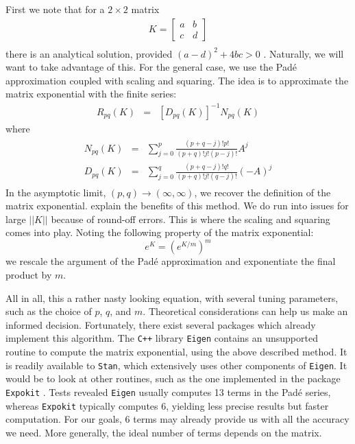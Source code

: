 \documentclass[11pt]{article}
\begin{document}
First we note that for a $2 \times 2$ matrix
\begin{eqnarray*}
   K = \left[\begin{array}{cc}
	a & b \\
	c & d
	\end{array}\right] \\
\end{eqnarray*}
%
there is an analytical solution, provided $(a - d)^2 + 4bc > 0$ \cite{ToddWeisstein}. Naturally, we will want to take
advantage of this.
%
For the general case, we use the Pad\'e approximation coupled with scaling and squaring.
The  idea is to approximate the matrix exponential with the finite series:
%
\begin{eqnarray*}
  R_{pq}(K) &=& [D_{pq}(K)]^{-1}  N_{pq}(K)
\end{eqnarray*}
%
where
%
\begin{eqnarray}
  \begin{aligned}
  N_{pq}(K) &=& \sum_{j=0}^p \frac{(p + q - j)! p!}{(p + q)! j! (p - j)!}A^j \\
  D_{pq}(K) &=& \sum_{j=0}^q \frac{(p + q - j)! q!}{(p + q)! j! (q - j)!}(-A)^j
  \end{aligned}
  \label{eq:pade}
\end{eqnarray}
%
In the asymptotic limit, $(p, q) \rightarrow (\infty, \infty)$, we recover the  definition of the 
matrix exponential. \cite{MolerAndVanLoan:2003} explain the benefits of this method.
%
We do run into issues for large $||K||$ because of round-off errors. This is where the scaling 
and squaring comes into play. Noting the following property of the matrix exponential:
%
$$ e^K = (e^{K/m})^m $$
%
we rescale the argument of the Pad\'e approximation and exponentiate the final product 
by $m$.

All in all, this a rather nasty looking equation, with several tuning parameters, such as the choice
of $p$, $q$, and $m$. Theoretical considerations can help us make an informed decision.
Fortunately, there exist several packages which already implement this algorithm.
The \texttt{C++} library \texttt{Eigen} \cite{Eigen:2013} contains an unsupported routine to compute
the matrix exponential, using the above described method.
It is readily available to \texttt{Stan}, which extensively uses other components of \texttt{Eigen}.
It would be to look at other routines, such as the one implemented in the package \texttt{Expokit} \cite{Sidje:1998}.
Tests revealed \texttt{Eigen} usually computes 13 terms in the Pad\'e series,
whereas \texttt{Expokit} typically computes 6, yielding less precise results but faster computation.
For our goals, 6 terms may already provide us with all the accuracy we need.
More generally, the ideal number of terms depends on the matrix.
\end{document}
